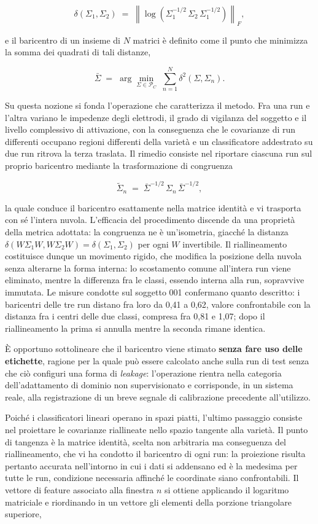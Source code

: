 \[
\delta(\Sigma_1, \Sigma_2) \;=\; \left\lVert \log\!\left( \Sigma_1^{-1/2}\, \Sigma_2\, \Sigma_1^{-1/2} \right) \right\rVert_F ,
\]

e il baricentro di un insieme di $N$ matrici è definito come il punto che minimizza la somma dei quadrati di tali distanze,

\[
\bar{\Sigma} \;=\; \arg\min_{\Sigma \in \mathcal{P}_C} \; \sum_{n=1}^{N} \delta^2(\Sigma, \Sigma_n) .
\]

Su questa nozione si fonda l’operazione che caratterizza il metodo. Fra una run e l’altra variano le impedenze degli elettrodi, il grado di vigilanza del soggetto e il livello complessivo di attivazione, con la conseguenza che le covarianze di run differenti occupano regioni differenti della varietà e un classificatore addestrato su due run ritrova la terza traslata. Il rimedio consiste nel riportare ciascuna run sul proprio baricentro mediante la trasformazione di congruenza

\[
\tilde{\Sigma}_n \;=\; \bar{\Sigma}^{-1/2}\, \Sigma_n\, \bar{\Sigma}^{-1/2} ,
\]

la quale conduce il baricentro esattamente nella matrice identità e vi trasporta con sé l’intera nuvola. L’efficacia del procedimento discende da una proprietà della metrica adottata: la congruenza ne è un’isometria, giacché la distanza $\delta(W \Sigma_1 W, W \Sigma_2 W) = \delta(\Sigma_1, \Sigma_2)$ per ogni $W$ invertibile. Il riallineamento costituisce dunque un movimento rigido, che modifica la posizione della nuvola senza alterarne la forma interna: lo scostamento comune all’intera run viene eliminato, mentre la differenza fra le classi, essendo interna alla run, sopravvive immutata. Le misure condotte sul soggetto 001 confermano quanto descritto: i baricentri delle tre run distano fra loro da 0,41 a 0,62, valore confrontabile con la distanza fra i centri delle due classi, compresa fra 0,81 e 1,07; dopo il riallineamento la prima si annulla mentre la seconda rimane identica.

È opportuno sottolineare che il baricentro viene stimato \textbf{senza fare uso delle etichette}, ragione per la quale può essere calcolato anche sulla run di test senza che ciò configuri una forma di \emph{leakage}: l’operazione rientra nella categoria dell’adattamento di dominio non supervisionato e corrisponde, in un sistema reale, alla registrazione di un breve segnale di calibrazione precedente all’utilizzo.

Poiché i classificatori lineari operano in spazi piatti, l’ultimo passaggio consiste nel proiettare le covarianze riallineate nello spazio tangente alla varietà. Il punto di tangenza è la matrice identità, scelta non arbitraria ma conseguenza del riallineamento, che vi ha condotto il baricentro di ogni run: la proiezione risulta pertanto accurata nell’intorno in cui i dati si addensano ed è la medesima per tutte le run, condizione necessaria affinché le coordinate siano confrontabili. Il vettore di feature associato alla finestra $n$ si ottiene applicando il logaritmo matriciale e riordinando in un vettore gli elementi della porzione triangolare superiore,

